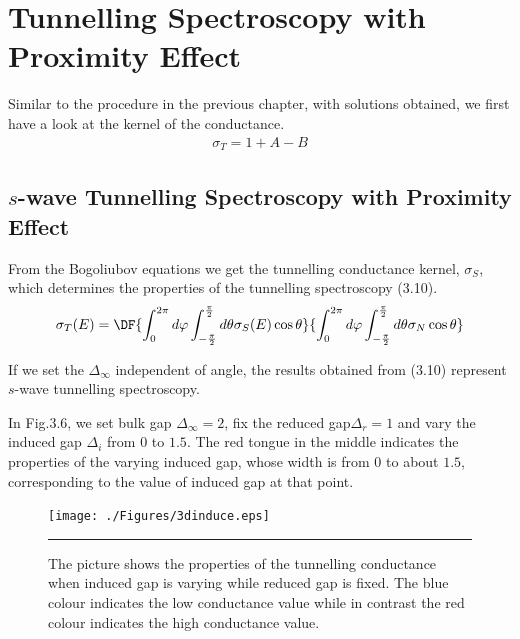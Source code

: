 \section{Tunnelling Spectroscopy with Proximity Effect}
Similar to the procedure in the previous chapter, with solutions obtained, we first have a look at the kernel of the conductance.
\begin{eqnarray}
\sigma_T=1+A-B
\end{eqnarray}

\subsection{$s$-wave Tunnelling Spectroscopy with Proximity Effect}
From the Bogoliubov equations we get the tunnelling conductance kernel, $\sigma_S$, which determines the properties of the tunnelling spectroscopy (3.10).
\begin{eqnarray}
\sigma_T(E)=\DF{\int_0^{2\pi}d\varphi\int_{-\frac{\pi}{2}}^{\frac{\pi}{2}}d\theta \sigma_S(E)\cos\theta}{\int_{0}^{2\pi}d\varphi\int_{-\frac{\pi}{2}}^{\frac{\pi}{2}}d\theta\sigma_N\cos\theta}
\end{eqnarray}

If we set the $\Delta_{\infty}$ independent of angle, the results obtained from (3.10) represent $s$-wave tunnelling spectroscopy.

In Fig.3.6, we set bulk gap $\Delta_{\infty}=2$, fix the reduced gap$\Delta_r=1$ and vary the induced gap $\Delta_i$ from $0$ to $1.5$.  The red tongue in the middle indicates the properties of the varying induced gap, whose width is from $0$ to about $1.5$, corresponding to the value of induced gap at that point.
\begin{figure}[htbp]
\small
	\centering
		\texttt{[image: ./Figures/3dinduce.eps]}
		\rule{35em}{0.5pt}
	\caption[An Electron]{The picture shows the properties of the tunnelling conductance when induced gap is varying while reduced gap is fixed. The blue colour indicates the low conductance value while in contrast the red colour indicates the high conductance value.}
	\label{fig:Electron}
\end{figure}

